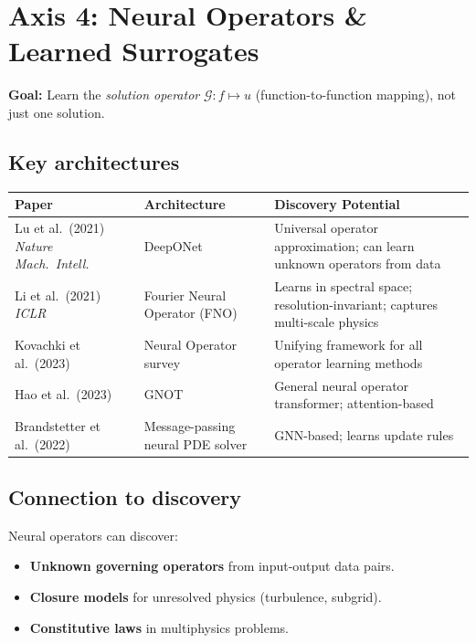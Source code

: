 \documentclass[11pt,a4paper]{article}
\begin{document}
\section{Axis 4: Neural Operators \& Learned Surrogates}

\textbf{Goal:} Learn the \emph{solution operator} $\mathcal{G}: f \mapsto u$ (function-to-function mapping), not just one solution.

\subsection{Key architectures}

\begin{center}
\renewcommand{\arraystretch}{1.3}
\begin{tabular}{@{}p{3.5cm} p{3.5cm} p{5.5cm}@{}}
\toprule
\textbf{Paper} & \textbf{Architecture} & \textbf{Discovery Potential} \\
\midrule
Lu et al.\ (2021) \textit{Nature Mach.\ Intell.} & DeepONet & Universal operator approximation; can learn unknown operators from data \\
\addlinespace
Li et al.\ (2021) \textit{ICLR} & Fourier Neural Operator (FNO) & Learns in spectral space; resolution-invariant; captures multi-scale physics \\
\addlinespace
Kovachki et al.\ (2023) & Neural Operator survey & Unifying framework for all operator learning methods \\
\addlinespace
Hao et al.\ (2023) & GNOT & General neural operator transformer; attention-based \\
\addlinespace
Brandstetter et al.\ (2022) & Message-passing neural PDE solver & GNN-based; learns update rules \\
\bottomrule
\end{tabular}
\end{center}

\subsection{Connection to discovery}

Neural operators can discover:
\begin{itemize}[leftmargin=1.8em,itemsep=2pt]
\item \textbf{Unknown governing operators} from input-output data pairs.
\item \textbf{Closure models} for unresolved physics (turbulence, subgrid).
\item \textbf{Constitutive laws} in multiphysics problems.
\end{itemize}
\end{document}

